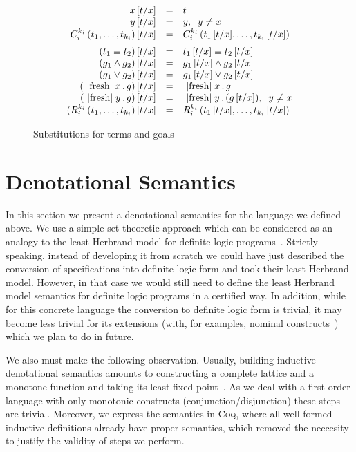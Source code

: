 \begin{figure}[t]
\[
\begin{array}{rcl}
  x\,[t/x] &=& t \\
  y\,[t/x] &=& y,\;\; y\ne x\\
  C_i^{k_i}\,(t_1,\dots,t_{k_i})\,[t/x]&=&C_i^{k_i}\,(t_1\,[t/x],\dots,t_{k_i}\,[t/x])\\[2mm]
  (t_1 \equiv t_2)\,[t/x]&=&t_1\,[t/x] \equiv t_2\,[t/x]\\
  (g_1 \wedge g_2)\,[t/x]&=&g_1\,[t/x] \wedge g_2\,[t/x]\\
  (g_1 \vee g_2)\,[t/x]&=&g_1\,[t/x] \vee g_2\,[t/x]\\
  (\mbox{\lstinline|fresh|}\;x\,.\,g)\,[t/x]&=&\mbox{\lstinline|fresh|}\;x\,.\,g\\
  (\mbox{\lstinline|fresh|}\;y\,.\,g)\,[t/x]&=&\mbox{\lstinline|fresh|}\;y\,.\,(g\,[t/x]),\;\;y\ne x\\
  (R_i^{k_i}\,(t_1,\dots,t_{k_i})\,[t/x]&=&R_i^{k_i}\,(t_1\,[t/x],\dots,t_{k_i}\,[t/x])
\end{array}
\]
  \caption{Substitutions for terms and goals}
  \label{substitution}
\end{figure}

\section{Denotational Semantics}
\label{denotational}

In this section we present a denotational semantics for the language we defined above. We use a simple set-theoretic
approach which can be considered as an analogy to the least Herbrand model for definite logic programs~\cite{LHM}.
Strictly speaking, instead of developing it from scratch we could have just described the conversion of specifications
into definite logic form and took their least Herbrand model. However, in that case we would still need to define
the least Herbrand model semantics for definite logic programs in a certified way. In addition, while for
this concrete language the conversion to definite logic form is trivial, it may become less trivial for
its extensions (with, for examples, nominal constructs~\cite{AlphaKanren}) which we plan to do in future.

We also must make the following observation. Usually, building inductive denotational semantics amounts to
constructing a complete lattice and a monotone function and taking its least fixed point~\cite{TarskiKnaster}.
As we deal with a first-order language with only monotonic constructs (conjunction/disjunction) these steps
are trivial. Moreover, we express the semantics in \textsc{Coq}, where all well-formed inductive definitions already
have proper semantics, which removed the neccesity to justify the validity of steps we perform.

